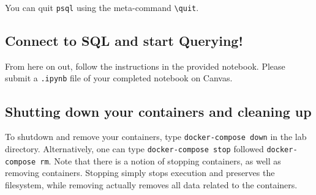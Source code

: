 \documentclass[paper=letter, fontsize=12pt]{article}
\numberwithin{equation}{section}
\numberwithin{figure}{section}
\numberwithin{table}{section}
\begin{document}
You can quit \texttt{psql} using the meta-command
\texttt{{\textbackslash}quit}.

\subsection{Connect to SQL and start Querying!}

From here on out, follow the instructions in the provided notebook.  Please
submit a \texttt{.ipynb} file of your completed
notebook on Canvas.

\subsection{Shutting down your containers and cleaning up}

To shutdown and remove your containers, type \texttt{docker-compose down} in
the lab directory.  Alternatively, one can type \texttt{docker-compose stop}
followed \texttt{docker-compose rm}.  Note that there is a notion of stopping
containers, as well as removing containers.  Stopping simply stops execution
and preserves the filesystem, while removing actually removes all data related
to the containers.
\end{document}
